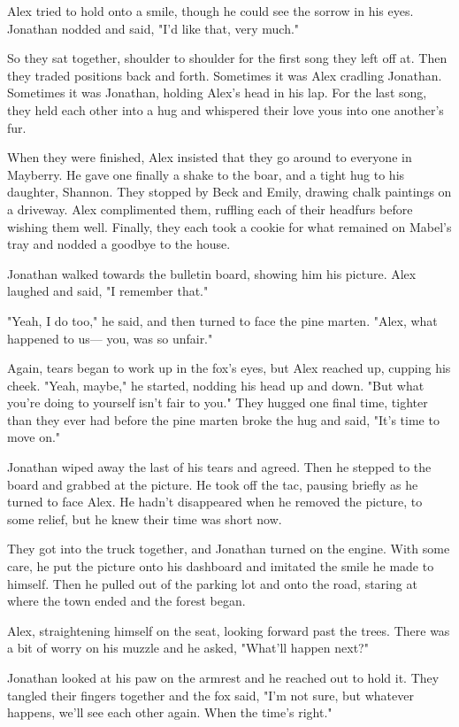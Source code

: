 Alex tried to hold onto a smile, though he could see the sorrow in his eyes. Jonathan nodded and said, "I'd like that, very much."

So they sat together, shoulder to shoulder for the first song they left off at. Then they traded positions back and forth. Sometimes it was Alex cradling Jonathan. Sometimes it was Jonathan, holding Alex's head in his lap. For the last song, they held each other into a hug and whispered their love yous into one another's fur.

When they were finished, Alex insisted that they go around to everyone in Mayberry. He gave one finally a shake to the boar, and a tight hug to his daughter, Shannon. They stopped by Beck and Emily, drawing chalk paintings on a driveway. Alex complimented them, ruffling each of their headfurs before wishing them well. Finally, they each took a cookie for what remained on Mabel's tray and nodded a goodbye to the house.

Jonathan walked towards the bulletin board, showing him his picture. Alex laughed and said, "I remember that."

"Yeah, I do too," he said, and then turned to face the pine marten. "Alex, what happened to us--- you, was so unfair."

Again, tears began to work up in the fox's eyes, but Alex reached up, cupping his cheek. "Yeah, maybe," he started, nodding his head up and down. "But what you're doing to yourself isn't fair to you." They hugged one final time, tighter than they ever had before the pine marten broke the hug and said, "It's time to move on."

Jonathan wiped away the last of his tears and agreed. Then he stepped to the board and grabbed at the picture. He took off the tac, pausing briefly as he turned to face Alex. He hadn't disappeared when he removed the picture, to some relief, but he knew their time was short now.

They got into the truck together, and Jonathan turned on the engine. With some care, he put the picture onto his dashboard and imitated the smile he made to himself. Then he pulled out of the parking lot and onto the road, staring at where the town ended and the forest began.

Alex, straightening himself on the seat, looking forward past the trees. There was a bit of worry on his muzzle and he asked, "What'll happen next?"

Jonathan looked at his paw on the armrest and he reached out to hold it. They tangled their fingers together and the fox said, "I'm not sure, but whatever happens, we'll see each other again. When the time's right."

